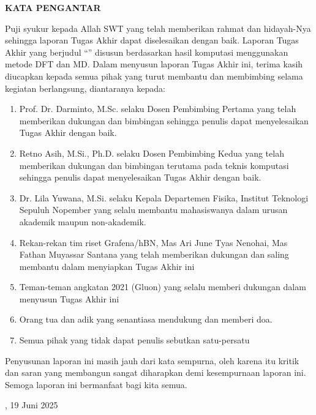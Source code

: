 \pagebreak
\begin{center}
    {\textbf{KATA PENGANTAR}}
    \pagestyle{fancy}
\end{center}

Puji syukur kepada Allah SWT yang telah memberikan rahmat dan hidayah-Nya sehingga laporan Tugas Akhir dapat diselesaikan dengan baik. Laporan Tugas Akhir yang berjudul “\judulTA” disusun berdasarkan hasil komputasi menggunakan metode DFT dan MD. Dalam menyusun laporan Tugas Akhir ini, terima kasih diucapkan kepada semua pihak yang turut membantu dan membimbing selama kegiatan berlangsung, diantaranya kepada:
\begin{enumerate}
    \item Prof. Dr. Darminto, M.Sc. selaku Dosen Pembimbing Pertama yang telah memberikan dukungan dan bimbingan sehingga penulis dapat menyelesaikan Tugas Akhir dengan baik.
    \item Retno Asih, M.Si., Ph.D. selaku Dosen Pembimbing Kedua yang telah memberikan dukungan dan bimbingan terutama pada teknis komputasi sehingga penulis dapat menyelesaikan Tugas Akhir dengan baik.
    \item Dr. Lila Yuwana, M.Si. selaku Kepala Departemen Fisika, Institut Teknologi Sepuluh Nopember yang selalu membantu mahasiswanya dalam urusan akademik maupun non-akademik.
    \item Rekan-rekan tim riset Grafena/hBN, Mas Ari June Tyas Nenohai, Mas Fathan Muyassar Santana yang telah memberikan dukungan dan saling membantu dalam menyiapkan Tugas Akhir ini
    \item Teman-teman angkatan 2021 (Gluon) yang selalu memberi dukungan dalam menyusun Tugas Akhir ini
    \item Orang tua dan adik yang senantiasa mendukung dan memberi doa.
    \item Semua pihak yang tidak dapat penulis sebutkan satu-persatu
    
\end{enumerate}
Penyusunan laporan ini masih jauh dari kata sempurna, oleh karena itu kritik dan saran yang membangun sangat diharapkan demi kesempurnaan laporan ini. Semoga laporan ini bermanfaat bagi kita semua.
\vspace{6mm}

\begin{flushright}

\namaKota, 19 Juni 2025

\vspace{15mm}

\namaMahasiswa

\end{flushright}

\newpage